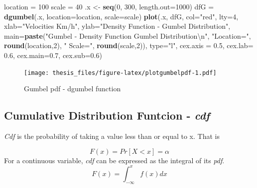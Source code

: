 \documentclass[12pt,twoside]{reedthesis}
\newenvironment{Shaded}{\begin{snugshade}}{\end{snugshade}}
\newcommand{\CharTok}[1]{\textcolor[rgb]{0.31,0.60,0.02}{#1}}
\newcommand{\DataTypeTok}[1]{\textcolor[rgb]{0.13,0.29,0.53}{#1}}
\newcommand{\DecValTok}[1]{\textcolor[rgb]{0.00,0.00,0.81}{#1}}
\newcommand{\FloatTok}[1]{\textcolor[rgb]{0.00,0.00,0.81}{#1}}
\newcommand{\KeywordTok}[1]{\textcolor[rgb]{0.13,0.29,0.53}{\textbf{#1}}}
\newcommand{\NormalTok}[1]{#1}
\newcommand{\StringTok}[1]{\textcolor[rgb]{0.31,0.60,0.02}{#1}}
\begin{document}
\footnotesize
\begin{Shaded}
\begin{Highlighting}[]
\NormalTok{location =}\StringTok{ }\DecValTok{100}
\NormalTok{scale =}\StringTok{ }\DecValTok{40}
\NormalTok{.x <-}\StringTok{ }\KeywordTok{seq}\NormalTok{(}\DecValTok{0}\NormalTok{, }\DecValTok{300}\NormalTok{, }\DataTypeTok{length.out=}\DecValTok{1000}\NormalTok{)}
\NormalTok{dfG =}\StringTok{ }\KeywordTok{dgumbel}\NormalTok{(.x, }\DataTypeTok{location=}\NormalTok{location, }\DataTypeTok{scale=}\NormalTok{scale)}
\KeywordTok{plot}\NormalTok{(.x, dfG, }\DataTypeTok{col=}\StringTok{"red"}\NormalTok{, }\DataTypeTok{lty=}\DecValTok{4}\NormalTok{, }
     \DataTypeTok{xlab=}\StringTok{"Velocities Km/h"}\NormalTok{, }\DataTypeTok{ylab=}\StringTok{"Density Function - Gumbel Distribution"}\NormalTok{, }
     \DataTypeTok{main=}\KeywordTok{paste}\NormalTok{(}\StringTok{"Gumbel - Density Function Gumbel Distribution}\CharTok{\textbackslash{}n}\StringTok{"}\NormalTok{, }\StringTok{"Location="}\NormalTok{, }
     \KeywordTok{round}\NormalTok{(location,}\DecValTok{2}\NormalTok{), }\StringTok{" Scale="}\NormalTok{, }\KeywordTok{round}\NormalTok{(scale,}\DecValTok{2}\NormalTok{)), }\DataTypeTok{type=}\StringTok{"l"}\NormalTok{, }
     \DataTypeTok{cex.axis =} \FloatTok{0.5}\NormalTok{, }\DataTypeTok{cex.lab=} \FloatTok{0.6}\NormalTok{, }\DataTypeTok{cex.main=}\FloatTok{0.7}\NormalTok{, }\DataTypeTok{cex.sub=}\FloatTok{0.6}\NormalTok{)}
\end{Highlighting}
\end{Shaded}
\begin{figure}
\centering
\texttt{[image: thesis\_files/figure-latex/plotgumbelpdf-1.pdf]}
\caption{\label{fig:plotgumbelpdf}Gumbel pdf - dgumbel function}
\end{figure}
\normalsize

\hypertarget{cumulative-distribution-funtcion---cdf}{%
\subsection{\texorpdfstring{Cumulative Distribution Funtcion - \emph{cdf}}{Cumulative Distribution Funtcion - cdf}}\label{cumulative-distribution-funtcion---cdf}}

\emph{Cdf} is the probability of taking a value less than or equal to x. That is

\[
F(x) = Pr[X < x] = \alpha
\]
For a continuous variable, \emph{cdf} can be expressed as the integral of its \emph{pdf}.
\[
F(x) = \int_{-\infty}^x f(x)dx
\]
\end{document}
